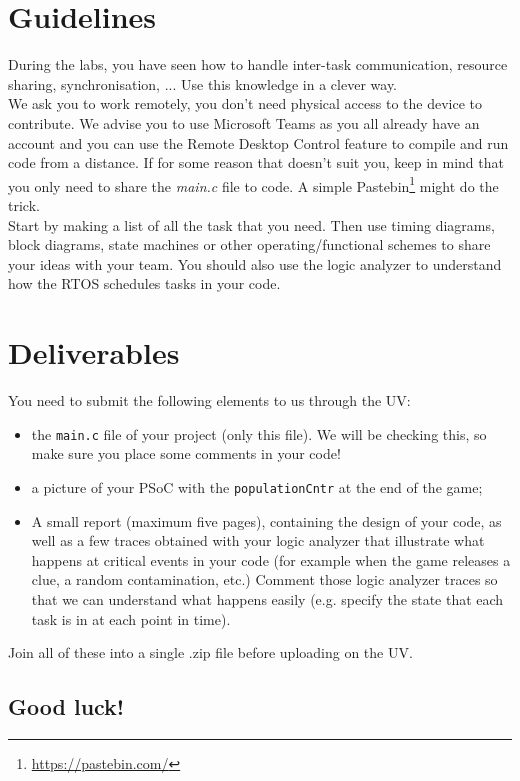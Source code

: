 \section*{Guidelines}

During the labs, you have seen how to handle inter-task communication, resource sharing, synchronisation, ...
Use this knowledge in a clever way.\\

We ask you to work remotely, you don't need physical access to the device to contribute.
We advise you to use Microsoft Teams as you all already have an account and you can use the Remote Desktop Control feature to compile and run code from a distance.
If for some reason that doesn't suit you, keep in mind that you only need to share the \textit{main.c} file to code.
A simple Pastebin\footnote{\url{https://pastebin.com/}} might do the trick. \\

Start by making a list of all the task that you need. Then use timing diagrams, block diagrams, state machines or other operating/functional schemes to share your ideas with your team. You should also use the logic analyzer to understand how the RTOS schedules tasks in your code. \\


\section*{Deliverables}

You need to submit the following elements to us through the UV: 
\begin{itemize}
	\item the \texttt{main.c} file  of your project (only this file). We will be checking this, so make sure you place some comments in your code!  
	\item a picture of your PSoC with the \texttt{populationCntr} at the end of the game; 
	\item A small report (maximum five pages), containing the design of your code, as well as a few traces obtained with your logic analyzer that illustrate what happens at critical events in your code (for example when the game releases a clue, a random contamination, etc.) Comment those logic analyzer traces so that we can understand what happens easily (e.g. specify the state that each task is in at each point in time). 
\end{itemize}
Join all of these into a single .zip file before uploading on the UV. 

\begin{flushright}
\section*{Good luck!}
\end{flushright}
